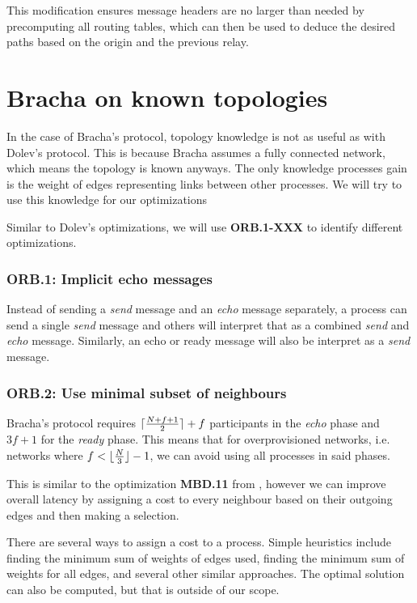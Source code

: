 This modification ensures message headers are no larger than needed by precomputing all routing tables, which can then be used to deduce the desired paths based on the origin and the previous relay. 


\section{Bracha on known topologies}
\label{contr-bracha}
In the case of Bracha's protocol, topology knowledge is not as useful as with Dolev's protocol. This is because Bracha assumes a fully connected network, which means the topology is known anyways. The only knowledge processes gain is the weight of edges representing links between other processes. We will try to use this knowledge for our optimizations

Similar to Dolev's optimizations, we will use \textbf{ORB.1-XXX} to identify different optimizations.

\subsubsection{ORB.1: Implicit echo messages}
Instead of sending a \textit{send} message and an \textit{echo} message separately, a process can send a single \textit{send} message and others will interpret that as a combined \textit{send} and \textit{echo} message. Similarly, an echo or ready message will also be interpret as a \textit{send} message.

\subsubsection{ORB.2: Use minimal subset of neighbours}
Bracha's protocol requires $\lceil\frac{N+f+1}{2}\rceil + f$ participants in the \textit{echo} phase and $3f+1$ for the \textit{ready} phase. This means that for overprovisioned networks, i.e. networks where $f < \lfloor\frac{N}{3}\rfloor - 1$, we can avoid using all processes in said phases.

This is similar to the optimization \textbf{MBD.11} from \cite{bonomi2021practical}, however we can improve overall latency by assigning a cost to every neighbour based on their outgoing edges and then making a selection. 

There are several ways to assign a cost to a process. Simple heuristics include finding the minimum sum of weights of edges used, finding the minimum sum of weights for all edges, and several other similar approaches. The optimal solution can also be computed, but that is outside of our scope.

